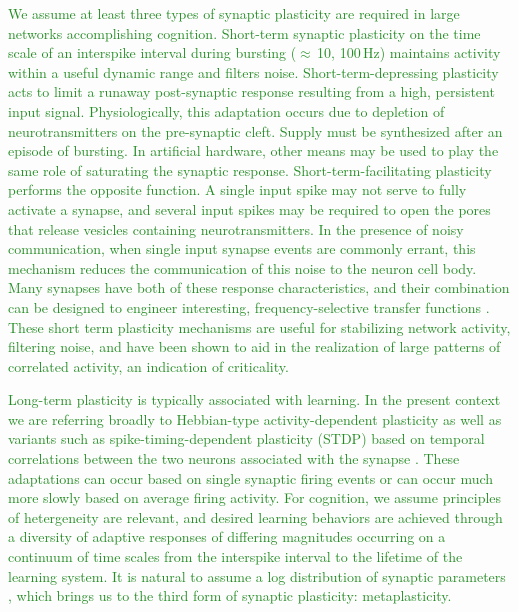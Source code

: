 \documentclass[twocolumn]{article}
\begin{document}
\textcolor{ForestGreen}{We assume at least three types of synaptic plasticity are required in large networks accomplishing cognition. Short-term synaptic plasticity on the time scale of an interspike interval during bursting ($\approx$\,10\ms, 100\,Hz) maintains activity within a useful dynamic range and filters noise. Short-term-depressing plasticity acts to limit a runaway post-synaptic response resulting from a high, persistent input signal. Physiologically, this adaptation occurs due to depletion of neurotransmitters on the pre-synaptic cleft. Supply must be synthesized after an episode of bursting. In artificial hardware, other means may be used to play the same role of saturating the synaptic response. Short-term-facilitating plasticity performs the opposite function. A single input spike may not serve to fully activate a synapse, and several input spikes may be required to open the pores that release vesicles containing neurotransmitters. In the presence of noisy communication, when single input synapse events are commonly errant, this mechanism reduces the communication of this noise to the neuron cell body. Many synapses have both of these response characteristics, and their combination can be designed to engineer interesting, frequency-selective transfer functions \cite{}. These short term plasticity mechanisms are useful for stabilizing network activity, filtering noise, and have been shown to aid in the realization of large patterns of correlated activity, an indication of criticality.}

\textcolor{ForestGreen}{Long-term plasticity is typically associated with learning. In the present context we are referring broadly to Hebbian-type activity-dependent plasticity as well as variants such as spike-timing-dependent plasticity (STDP) based on temporal correlations between the two neurons associated with the synapse \cite{}. These adaptations can occur based on single synaptic firing events or can occur much more slowly based on average firing activity. For cognition, we assume principles of hetergeneity are relevant, and desired learning behaviors are achieved through a diversity of adaptive responses of differing magnitudes occurring on a continuum of time scales from the interspike interval to the lifetime of the learning system. It is natural to assume a log distribution of synaptic parameters \cite{}, which brings us to the third form of synaptic plasticity: metaplasticity.}
\end{document}
